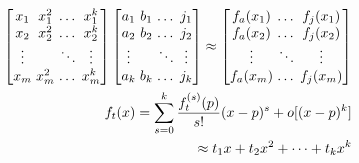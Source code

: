 \begin{equation}
    \label{eq:comp_mat}
    \begin{aligned}
    \setlength{\arraycolsep}{1.5pt}
        \begin{bmatrix} 
            x_1    & x_1^2  &   \dots   & x_1^k  \\
            x_2    & x_2^2  &   \dots   & x_2^k  \\
            \vdots &        & \ddots    & \vdots \\
            x_m    & x_m^2  &   \dots   & x_m^k  
        \end{bmatrix}
        \begin{bmatrix} 
            a_1    & b_1    &   \dots   & j_1 \\
            a_2    & b_2    &   \dots   & j_2  \\
            \vdots &        & \ddots    & \vdots \\
            a_k    & b_k    &   \dots   & j_k  
        \end{bmatrix}
        \approx
        \begin{bmatrix}
            f_{a}(x_1)  &     \dots   & f_{j}(x_1)    \\
            f_{a}(x_2)  &     \dots   & f_{j}(x_2)    \\
            \vdots      & \ddots    & \vdots        \\
            f_{a}(x_m)  &   \dots   & f_{j}(x_m)
        \end{bmatrix} \\
        f_t(x) = \sum_{s = 0}^{k}\frac{f_t^{(s)}(p)}{s!}(x - p)^s + o[(x - p) ^ k] \\
        \approx t_1x + t_2x^2 + \dots + t_kx^k
    \end{aligned}
    \end{equation}

